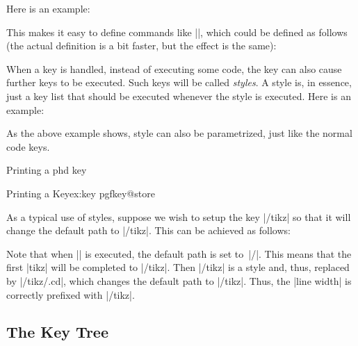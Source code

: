 Here is an example:
\begin{codeexample}
\end{codeexample}
This makes it easy to define commands like |\tikzset|, which could be
defined as follows (the actual definition is a bit faster, but the
effect is the same):
\begin{codeexample}
\def\tikzset#1{\pgfkeys{/tikz/.cd,#1}}
\end{codeexample}

When a key is handled, instead of executing some code, the key can
also cause further keys to be executed. Such keys will be called
\emph{styles}. A style is, in essence, just a key list that should be
executed whenever the style is executed. Here is an example:
\begin{codeexample}[]
\end{codeexample}
As the above example shows, style can also be parametrized, just like
the normal code keys.

Printing a phd key 
\begin{texexample}{Printing a Key}{ex:key}
\expandafter\meaning\expandafter{}   
\makeatletter
\csname pgfkey@store
\makeatother      
\end{texexample}


As a typical use of styles, suppose we wish to setup the key |/tikz|
so that it will change the default path to |/tikz|. This can be
achieved as follows:
\begin{codeexample}
\end{codeexample}

Note that when |\pgfkeys| is executed, the default path is set
to~|/|. This means that the first |tikz| will be completed to
|/tikz|. Then |/tikz| is a style and, thus, replaced by |/tikz/.cd|,
which changes the default path to |/tikz|. Thus, the |line width| is
correctly prefixed with |/tikz|.

\subsection{The Key Tree}

